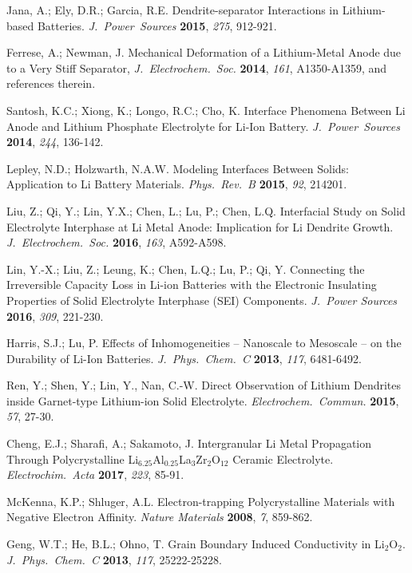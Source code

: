 \documentclass[prb,preprint,amsmath,amssymb]{revtex4}
\begin{document}
\begin{references}
Jana, A.; Ely, D.R.; Garcia, R.E.  
Dendrite-separator Interactions in Lithium-based Batteries.
{\it J.~Power~Sources} {\bf 2015}, {\it 275}, 912-921.

Ferrese, A.; Newman, J.
Mechanical Deformation of a Lithium-Metal Anode due to a Very Stiff
Separator, {\it J.~Electrochem.~Soc.} {\bf 2014}, {\it 161}, A1350-A1359,
and references therein.

Santosh, K.C.; Xiong, K.; Longo, R.C.; Cho, K.  
Interface Phenomena Between Li Anode and Lithium Phosphate Electrolyte for
Li-Ion Battery.  {\it J.~Power~Sources} {\bf 2014}, {\it 244}, 136-142.

Lepley, N.D.; Holzwarth, N.A.W.  
Modeling Interfaces Between Solids: Application to Li Battery Materials.
{\it Phys.~Rev.~B} {\bf 2015}, {\it 92}, 214201.

Liu, Z.; Qi, Y.; Lin, Y.X.; Chen, L.; Lu, P.; Chen, L.Q.
Interfacial Study on Solid Electrolyte Interphase at Li Metal Anode:
Implication for Li Dendrite Growth.
{\it J.~Electrochem.~Soc.} {\bf 2016}, {\it 163}, A592-A598.

Lin, Y.-X.; Liu, Z.; Leung, K.; Chen, L.Q.; Lu, P.; Qi, Y.
Connecting the Irreversible Capacity Loss in Li-ion Batteries with the
Electronic Insulating Properties of Solid Electrolyte Interphase (SEI)
Components.  {\it J.~Power Sources} {\bf 2016}, {\it 309}, 221-230.

Harris, S.J.; Lu, P.  Effects of Inhomogeneities -- Nanoscale to
Mesoscale -- on the Durability of Li-Ion Batteries.  {\it J.~Phys.~Chem.~C}
{\bf 2013}, {\it 117}, 6481-6492.

Ren, Y.; Shen, Y.; Lin, Y., Nan, C.-W.
Direct Observation of Lithium Dendrites inside Garnet-type Lithium-ion
Solid Electrolyte.
{\it Electrochem.~Commun.} {\bf 2015}, {\it 57}, 27-30.

Cheng, E.J.; Sharafi, A.; Sakamoto, J.
Intergranular Li Metal Propagation Through Polycrystalline
Li$_{6.25}$Al$_{0.25}$La$_3$Zr$_2$O$_{12}$ Ceramic Electrolyte.
{\it Electrochim.~Acta} {\bf 2017}, {\it 223}, 85-91.

McKenna, K.P.; Shluger, A.L.  
Electron-trapping Polycrystalline Materials with Negative Electron Affinity.
{\it Nature Materials} {\bf 2008}, {\it 7}, 859-862.

Geng, W.T.; He, B.L.; Ohno, T.  Grain Boundary Induced Conductivity in 
Li$_2$O$_2$.  {\it J.~Phys.~Chem.~C} {\bf 2013}, {\it 117}, 25222-25228.


\end{references}
\end{document}
